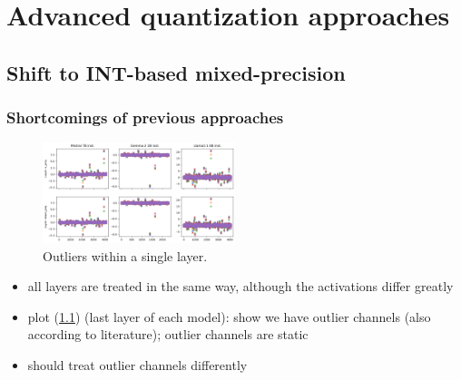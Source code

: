 
\chapter{Advanced quantization approaches}
\section{Shift to INT-based mixed-precision}
\subsection{Shortcomings of previous approaches}
\begin{figure}
\centering
\includegraphics[width=0.5\textwidth]{figures/plot_outlier_channels}
\caption{Outliers within a single layer.}
\label{fig:plot_outlier_channels}
\end{figure}

\begin{itemize}
	\item all layers are treated in the same way, although the activations differ greatly
	\item plot (\ref{fig:plot_outlier_channels}) (last layer of each model): show we have outlier channels (also according to literature); outlier channels are static
    \item should treat outlier channels differently
\end{itemize}


